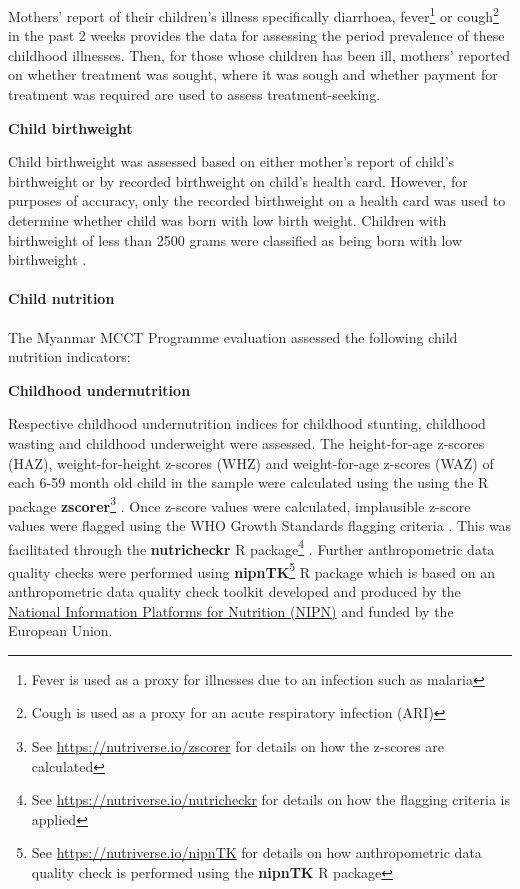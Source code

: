 \documentclass[12pt,a4paper]{article}
\let\oldparagraph\paragraph
\renewcommand{\paragraph}[1]{\oldparagraph{#1}\mbox{}}
\let\rmarkdownfootnote\footnote%
\def\footnote{\protect\rmarkdownfootnote}
\begin{document}
Mothers' report of their children's illness specifically diarrhoea, fever\footnote{Fever is used as a proxy for illnesses due to an infection such as malaria} or cough\footnote{Cough is used as a proxy for an acute respiratory infection (ARI)} in the past 2 weeks provides the data for assessing the period prevalence of these childhood illnesses. Then, for those whose children has been ill, mothers' reported on whether treatment was sought, where it was sough and whether payment for treatment was required are used to assess treatment-seeking.

\textbf{Child birthweight}

Child birthweight was assessed based on either mother's report of child's birthweight or by recorded birthweight on child's health card. However, for purposes of accuracy, only the recorded birthweight on a health card was used to determine whether child was born with low birth weight. Children with birthweight of less than 2500 grams were classified as being born with low birthweight \citep{Woertman:1993hp, Kelly:1997wa}.

\hypertarget{cnut}{%
\paragraph{Child nutrition}\label{cnut}}

The Myanmar MCCT Programme evaluation assessed the following child nutrition indicators:

\textbf{Childhood undernutrition}

Respective childhood undernutrition indices for childhood stunting, childhood wasting and childhood underweight were assessed. The height-for-age z-scores (HAZ), weight-for-height z-scores (WHZ) and weight-for-age z-scores (WAZ) of each 6-59 month old child in the sample were calculated using the using the R package \textbf{zscorer}\footnote{See \url{https://nutriverse.io/zscorer} for details on how the z-scores are calculated} \citep{zscorer2019}. Once z-score values were calculated, implausible z-score values were flagged using the WHO Growth Standards flagging criteria \citep{WorldHealthOrganizationWHO2006}. This was facilitated through the \textbf{nutricheckr} R package\footnote{See \url{https://nutriverse.io/nutricheckr} for details on how the flagging criteria is applied} \citep{nutricheckr2019}. Further anthropometric data quality checks were performed using \textbf{nipnTK}\footnote{See \url{https://nutriverse.io/nipnTK} for details on how anthropometric data quality check is performed using the \textbf{nipnTK} R package} \citep{nipnTK2019} R package which is based on an anthropometric data quality check toolkit developed and produced by the \href{http://www.nipn-nutrition-platforms.org}{National Information Platforms for Nutrition (NIPN)} and funded by the European Union.
\end{document}

